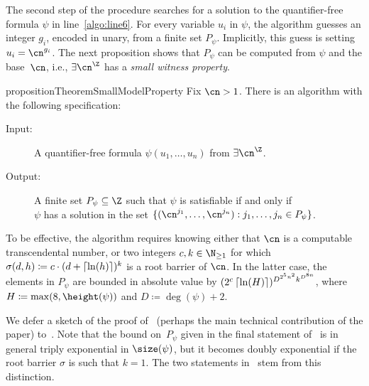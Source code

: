 The second step of the procedure searches for a solution to the quantifier-free
formula $\psi$ in line~\ref{algo:line6}. For every variable $u_i$ in $\psi$, the
algorithm guesses an integer $g_i$, encoded in unary, from a finite set $P_{\psi}$.
Implicitly, this guess is setting $u_i = \cn^{g_i}$. The next proposition shows
that $P_{\psi}$ can be computed from $\psi$ and the base~$\cn$, i.e.,
$\exists\ipow{\cn}$ has a \emph{small witness property}.%

\begin{restatable}{proposition}{TheoremSmallModelProperty}
  \label{theorem:small-model-property}
  Fix $\cn > 1$. There is an algorithm with the following specification: 
  \begin{center}
    \begin{minipage}{0.95\linewidth}
      \begin{description}
        \item[\textup{Input:}]\tab A quantifier-free formula $\psi(u_1,\dots,u_n)$ from $\exists \ipow{\cn}$. 
        \item[\textup{Output:}]\tab A finite set $P_{\psi} \subseteq \Z$ such that $\psi$ is satisfiable if and only if\\ 
        \tab\tab $\psi$ has a solution in the set $\{(\cn^{j_1},\dots,\cn^{j_n}) : j_1, \dots, j_n \in P_{\psi} \}$.
      \end{description}
    \end{minipage}
  \end{center}
  To be effective, the algorithm requires knowing either that $\cn$ is a
  computable transcendental number, or two integers  $c,k \in \N_{\geq 1}$ for
  which~$\sigma(d,h) \coloneqq c \cdot (d+\left\lceil\ln(h)\right\rceil)^k$ is a root barrier of
  $\cn$. In the latter case, the elements in $P_{\psi}$ are bounded in absolute
  value by $(2^{c}\left\lceil\ln(H)\right\rceil)^{D^{2^5n^2} k^{D^{8n}}}$, where $H \coloneqq
  \max(8,\height(\psi))$ and $D \coloneqq \deg(\psi)+2$.
\end{restatable}

\noindent
We defer a sketch of the proof of~ (perhaps
the main technical contribution of the paper)
to~. Note that the bound on~$P_{\psi}$ given in
the final statement of~ is in general triply
exponential in $\size(\psi)$, but it becomes doubly exponential if the root
barrier $\sigma$ is such that $k = 1$. The two statements
in~ stem from this distinction.


